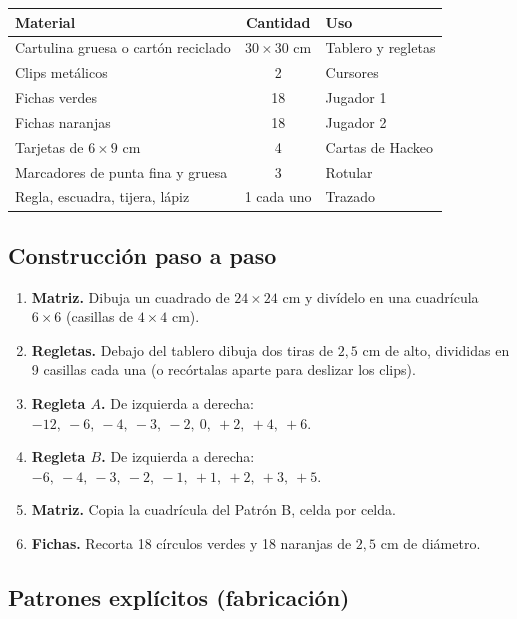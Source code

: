 \documentclass[12pt, letterpaper]{article}
\begin{document}
\begin{center}
\small
\begin{tabular}{@{}p{5.0cm} c p{7.4cm}@{}}
\toprule
\textbf{Material} & \textbf{Cantidad} & \textbf{Uso}\\
\midrule
Cartulina gruesa o cartón reciclado & $30\times 30$ cm & Tablero y regletas\\
Clips metálicos & 2 & Cursores\\
Fichas verdes & 18 & Jugador 1\\
Fichas naranjas & 18 & Jugador 2\\
Tarjetas de $6\times 9$ cm & 4 & Cartas de Hackeo\\
Marcadores de punta fina y gruesa & 3 & Rotular\\
Regla, escuadra, tijera, lápiz & 1 cada uno & Trazado\\
\bottomrule
\end{tabular}
\end{center}

\subsection{Construcción paso a paso}

\begin{enumerate}[leftmargin=*]
  \item \textbf{Matriz.} Dibuja un cuadrado de $24\times 24$ cm y divídelo en una cuadrícula $6\times 6$ (casillas de $4\times 4$ cm).
  \item \textbf{Regletas.} Debajo del tablero dibuja dos tiras de $2{,}5$ cm de alto, divididas en 9 casillas cada una (o recórtalas aparte para deslizar los clips).
  \item \textbf{Regleta $A$.} De izquierda a derecha: $-12,\ -6,\ -4,\ -3,\ -2,\ 0,\ +2,\ +4,\ +6$.
  \item \textbf{Regleta $B$.} De izquierda a derecha: $-6,\ -4,\ -3,\ -2,\ -1,\ +1,\ +2,\ +3,\ +5$.
  \item \textbf{Matriz.} Copia la cuadrícula del Patrón B, celda por celda.
  \item \textbf{Fichas.} Recorta 18 círculos verdes y 18 naranjas de $2{,}5$ cm de diámetro.
\end{enumerate}

\subsection{Patrones explícitos (fabricación)}
\end{document}
